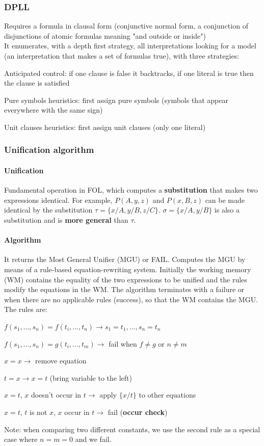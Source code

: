 \documentclass[10pt]{report}
\begin{document}
\subsubsection{DPLL} Requires a formula in clausal form (conjunctive normal form, a conjunction of disjunctions of atomic formulas meaning "and outside or inside")\\
It enumerates, with a depth first strategy, all interpretations looking for a model (an interpretation that makes a set of formulas true), with three strategies:
\begin{list}{}{}
	\item Anticipated control: if one clause is false it backtracks, if one literal is true then the clause is satisfied
	\item Pure symbols heuristics: first assign pure symbols (symbols that appear everywhere with the same sign)
	\item Unit clauses heuristics: first assign unit clauses (only one literal)
\end{list}
\subsubsection{Unification algorithm}
\paragraph{Unification} Fundamental operation in FOL, which computes a \textbf{substitution} that makes two expressions identical. For example, $P(A, y, z)$ and $P(x, B, z)$ can be made identical by the substitution $\tau = \{x/A, y/B, z/C\}$. $\sigma = \{x/A, y/B\}$ is also a substitution and is \textbf{more general} than $\tau$.
\paragraph{Algorithm} It returns the Most General Unifier (MGU) or FAIL. Computes the MGU by means of a rule-based equation-rewriting system. Initially the working memory (WM) contains the equality of the two expressions to be unified and the rules modify the equations in the WM. The algorithm terminates with a failure or when there are no applicable rules (success), so that the WM contains the MGU. The rules are:
\begin{list}{}{}
	\item $f(s_1,\ldots,s_n)=f(t_i,\ldots,t_n) \rightarrow s_1 = t_1, \ldots, s_n= t_n$
	\item $f(s_1,\ldots,s_n)=g(t_i,\ldots,t_m) \rightarrow$ fail when $f\neq g$ or $n\neq m$
	\item $x = x \rightarrow$ remove equation
	\item $t = x \rightarrow x = t$ (bring variable to the left)
	\item $x = t$, $x$ doesn't occur in $t \rightarrow$ apply $\{x/t\}$ to other equations
	\item $x = t$, $t$ is not $x$, $x$ occur in $t\rightarrow$ fail (\textbf{occur check})
\end{list}
Note: when comparing two different constants, we use the second rule as a special case where $n=m=0$ and we fail.
\end{document}

